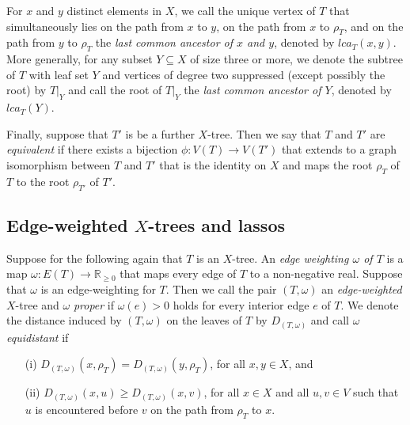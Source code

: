 For $x$ and $y$  distinct elements in $X$,
we call the unique vertex of $T$ that simultaneously lies on
the path from $x$ to $y$, on the path from $x$ to $\rho_T$, and
on the path from $y$ to $\rho_T$ the {\em last common ancestor of
$x$ and $y$}, denoted by $lca_T(x,y)$. More generally, for any 
subset $Y\subseteq X$ of size three or more,
we denote the subtree of $T$ with leaf set $Y$ and
vertices of degree two suppressed (except possibly the root)
by $T|_Y$ and call the root of $T|_Y$ the {\em last common ancestor of
$Y$}, denoted by $lca_T(Y)$.

Finally, suppose that $T'$ is be a further
$X$-tree. Then we say that $T$ and $T'$ 
are {\em equivalent} if there exists a bijection $\phi:V(T)\to V(T')$
that extends to a graph isomorphism between $T$ and $T'$ that is
the identity on $X$ and maps the root $\rho_T$ of $T$ to the
root $\rho_{T'}$ of $T'$. 


\subsection{Edge-weighted $X$-trees and lassos}

Suppose for the following again that $T$ is an $X$-tree.
An {\em edge weighting $\omega$ of $T$} is a map
$\omega :E(T)\to \mathbb R_{\geq 0}$ that maps every
edge of $T$ to a non-negative real. Suppose that $\omega$
is an edge-weighting for $T$. Then
we call the pair $(T,\omega)$ an {\em edge-weighted} $X$-tree and $\omega$
{\em proper} if $\omega(e)>0$ holds for every interior edge
$e$ of $T$. We denote the distance induced by $(T,\omega)$
on the leaves of $T$ by $D_{(T,\omega)}$
and call $\omega$ {\em equidistant} if 
\begin{enumerate}
\item[(i)] $D_{(T,\omega)}(x,\rho_T)=  D_{(T,\omega)}(y,\rho_T)$, for all
$x,y\in X$, and
\item[(ii)] $D_{(T,\omega)}(x,u)\geq  D_{(T,\omega)}(x,v)$, for all
$x\in X$ and all $u,v\in V$ such that $u$ is encountered
before $v$ on the path from $\rho_T$ to $x$.
\end{enumerate} 

